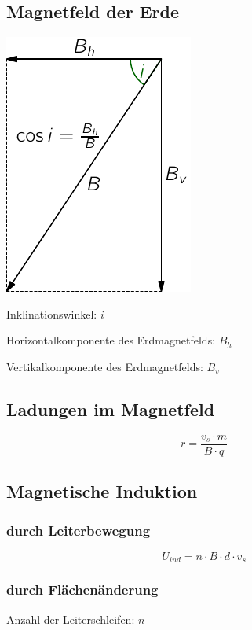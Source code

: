 \subsection{Magnetfeld der Erde}
\includegraphics[width=.4\linewidth]{magnetfeld_der_erde} \hfill
\begin{minipage}[b]{.55\linewidth}\raggedright
Inklinationswinkel: $i$

Horizontalkomponente des Erdmagnetfelds: $B_h$

Vertikalkomponente des Erdmagnetfelds: $B_v$
\end{minipage}

\subsection{Ladungen im Magnetfeld}
\begin{equation}\label{eq:magnetfeld:elektronen:kreisbahn}
r = \frac{v_s \cdot m}{B \cdot q}
\end{equation}

\subsection{Magnetische Induktion}

\subsubsection{durch Leiterbewegung}
\begin{equation}\label{eq:magnetische:induktion:leiterbewegung}
U_{ind} = n \cdot B \cdot d \cdot v_s
\end{equation}

\subsubsection{durch Flächenänderung}
Anzahl der Leiterschleifen: $n$

